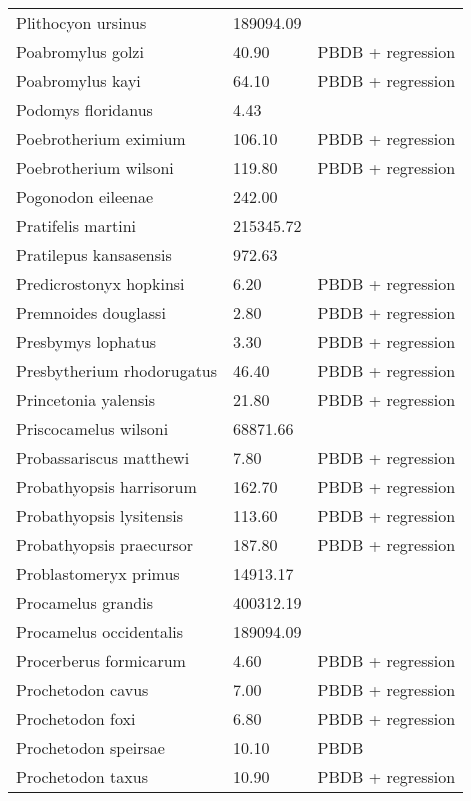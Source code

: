 \begin{longtable}{p{} p{} p{}}
    Plithocyon ursinus & 189094.09 & \cite{Tomiya2013} \\ 
    Poabromylus golzi & 40.90 & PBDB + regression \\ 
    Poabromylus kayi & 64.10 & PBDB + regression \\ 
    Podomys floridanus & 4.43 & \cite{Smith2004} \\ 
    Poebrotherium eximium & 106.10 & PBDB + regression \\ 
    Poebrotherium wilsoni & 119.80 & PBDB + regression \\ 
    Pogonodon eileenae & 242.00 & \cite{Fox2011b} \\ 
    Pratifelis martini & 215345.72 & \cite{Tomiya2013} \\ 
    Pratilepus kansasensis & 972.63 & \cite{Tomiya2013} \\ 
    Predicrostonyx hopkinsi & 6.20 & PBDB + regression \\ 
    Premnoides douglassi & 2.80 & PBDB + regression \\ 
    Presbymys lophatus & 3.30 & PBDB + regression \\ 
    Presbytherium rhodorugatus & 46.40 & PBDB + regression \\ 
    Princetonia yalensis & 21.80 & PBDB + regression \\ 
    Priscocamelus wilsoni & 68871.66 & \cite{Tomiya2013} \\ 
    Probassariscus matthewi & 7.80 & PBDB + regression \\ 
    Probathyopsis harrisorum & 162.70 & PBDB + regression \\ 
    Probathyopsis lysitensis & 113.60 & PBDB + regression \\ 
    Probathyopsis praecursor & 187.80 & PBDB + regression \\ 
    Problastomeryx primus & 14913.17 & \cite{Tomiya2013} \\ 
    Procamelus grandis & 400312.19 & \cite{Tomiya2013} \\ 
    Procamelus occidentalis & 189094.09 & \cite{Tomiya2013} \\ 
    Procerberus formicarum & 4.60 & PBDB + regression \\ 
    Prochetodon cavus & 7.00 & PBDB + regression \\ 
    Prochetodon foxi & 6.80 & PBDB + regression \\ 
    Prochetodon speirsae & 10.10 & PBDB \\ 
    Prochetodon taxus & 10.90 & PBDB + regression \\ 

\end{longtable}
